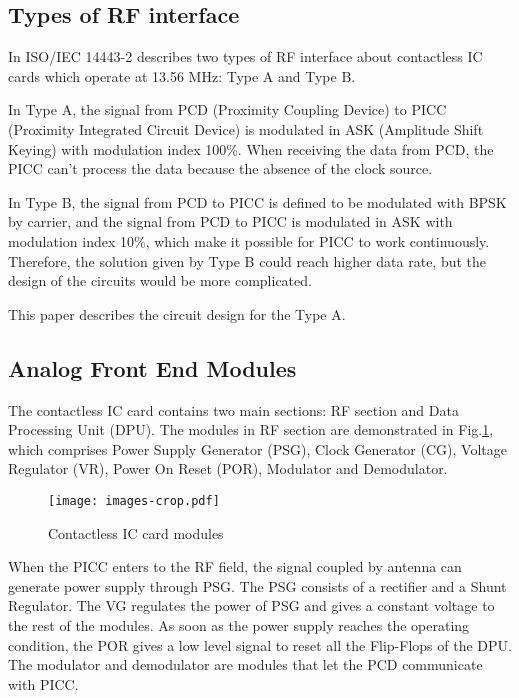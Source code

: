 \subsection{Types of RF interface}
In ISO/IEC 14443-2 describes two types of RF interface about contactless IC cards which operate at 13.56 MHz: Type A and Type B. 

In Type A, the signal from PCD (Proximity Coupling Device) to PICC (Proximity Integrated Circuit Device) is modulated in ASK (Amplitude Shift Keying) with modulation index 100\%. When receiving the data from PCD, the PICC can’t process the data because the absence of the clock source. 

In Type B,  the signal from PCD to PICC is defined to be modulated with BPSK by carrier, and the signal from PCD to PICC is modulated in ASK with modulation index 10\%, which make it possible for PICC to work continuously. Therefore, the solution given by Type B could reach higher data rate, but the design of the circuits would be more complicated.

This paper describes the circuit design for the Type A. 


\subsection{Analog Front End Modules}

The contactless IC card contains two main sections: RF section and Data Processing Unit (DPU). The modules in RF section are demonstrated in Fig.\ref{fig:modules}, which comprises Power Supply Generator (PSG), Clock Generator (CG), Voltage Regulator (VR), Power On Reset (POR), Modulator  and Demodulator. 

\begin{figure}[]
  \centering
  \texttt{[image: images-crop.pdf]}
  \caption{Contactless IC card modules}
  \label{fig:modules}
\end{figure}

When the PICC enters to the RF field, the signal coupled by antenna can generate power supply through PSG. The PSG consists of a rectifier and a Shunt Regulator. The VG regulates the power of PSG and gives a constant voltage to the rest of the modules. As soon as the power supply reaches the operating condition, the POR gives a low level signal to reset all the Flip-Flops of the DPU. The modulator and demodulator are modules that let the PCD communicate with PICC.